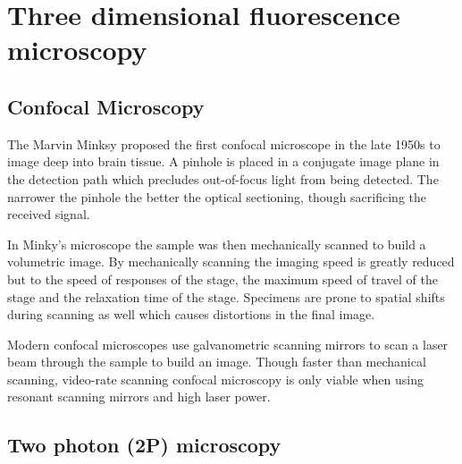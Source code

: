 \section{Three dimensional fluorescence microscopy}
\subsection{Confocal Microscopy}

The Marvin Minksy proposed the first confocal microscope in the late 1950s to image deep into brain tissue.
A pinhole is placed in a conjugate image plane in the detection path which precludes out-of-focus light from being detected.
The narrower the pinhole the better the optical sectioning, though sacrificing the received signal.

In Minky's microscope the sample was then mechanically scanned to build a volumetric image.
By mechanically scanning the imaging speed is greatly reduced but to the speed of responses of the stage, the maximum speed of travel of the stage and the relaxation time of the stage.
Specimens are prone to spatial shifts during scanning as well which causes distortions in the final image.

Modern confocal microscopes use galvanometric scanning mirrors to scan a laser beam through the sample to build an image.
Though faster than mechanical scanning, video-rate scanning confocal microscopy is only viable when using resonant scanning mirrors and high laser power.

%

\subsection{Two photon (2P) microscopy}


